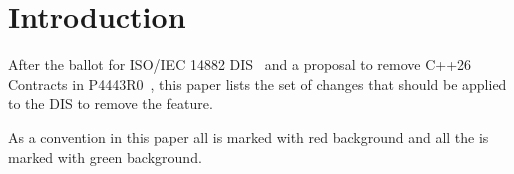 \section{Introduction}

After the ballot for ISO/IEC 14882 DIS~\cite{cpp26:dis} and a proposal to remove
C++26 Contracts in P4443R0~\cite{p4443r0}, this paper lists the set of changes
that should be applied to the DIS to remove the feature.

As a convention in this paper all  is marked with
red background and all the  is marked with green
background.
